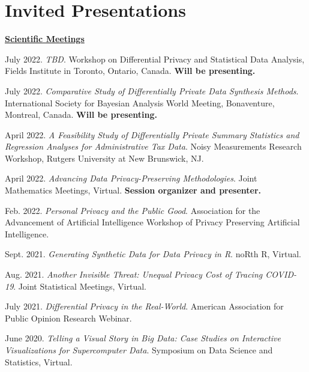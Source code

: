 \documentclass[11pt, letterpaper, roman]{moderncv} %
\begin{document}

\newpage
\section{Invited Presentations}

\underline{\textbf{\large Scientific Meetings}}\normalsize
\vspace{6pt}
\begin{etaremune}[topsep=0pt, itemsep=4pt, partopsep=0pt, parsep=0pt]
    \item July 2022. \textit{TBD}. Workshop on Differential Privacy and Statistical Data Analysis, Fields Institute in Toronto, Ontario, Canada. \textbf{Will be presenting.}

    \item July 2022. \textit{Comparative Study of Differentially Private Data Synthesis Methods}. International Society for Bayesian Analysis World Meeting, Bonaventure, Montreal, Canada. \textbf{Will be presenting.}
    
    \item April 2022. \textit{A Feasibility Study of Differentially Private Summary Statistics and Regression Analyses for Administrative Tax Data}. Noisy Measurements Research Workshop, Rutgers University at New Brunswick, NJ.
    
    \item April 2022. \textit{Advancing Data Privacy-Preserving Methodologies}. Joint Mathematics Meetings, Virtual. \textbf{Session organizer and presenter.}

    \item Feb. 2022. \textit{Personal Privacy and the Public Good}. Association for the Advancement of Artificial Intelligence Workshop of Privacy Preserving Artificial Intelligence.
    
    \item Sept. 2021. \textit{Generating Synthetic Data for Data Privacy in R}. noRth R, Virtual.

    \item Aug. 2021. \textit{Another Invisible Threat: Unequal Privacy Cost of Tracing COVID-19}. Joint Statistical Meetings, Virtual.
    
    \item July 2021. \textit{Differential Privacy in the Real-World}. American Association for Public Opinion Research Webinar.

    \item June 2020. \textit{Telling a Visual Story in Big Data: Case Studies on Interactive Visualizations for Supercomputer Data}. Symposium on Data Science and Statistics, Virtual.
  

\end{etaremune}
\end{document}
